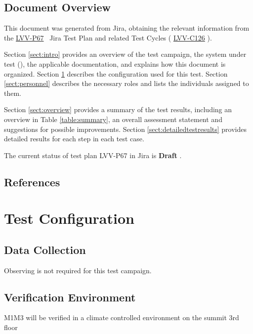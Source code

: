 \documentclass[SE,lsstdraft,STR,toc]{lsstdoc}
\begin{document}
\subsection{Document Overview}
\label{sect:docoverview}

This document was generated from Jira, obtaining the relevant information from the 
\href{https://jira.lsstcorp.org/secure/Tests.jspa#/testPlan/LVV-P67}{LVV-P67}
~Jira Test Plan and related Test Cycles (
  \href{https://jira.lsstcorp.org/secure/Tests.jspa#/testCycle/LVV-C126}{LVV-C126}
).

Section \ref{sect:intro} provides an overview of the test campaign, the system under test (\product{}), the applicable documentation, and explains how this document is organized.
Section \ref{sect:configuration}  describes the configuration used for this test.
Section \ref{sect:personnel} describes the necessary roles and lists the individuals assigned to them.

Section \ref{sect:overview} provides a summary of the test results, including an overview in Table \ref{table:summary}, an overall assessment statement and suggestions for possible improvements.
Section \ref{sect:detailedtestresults} provides detailed results for each step in each test case.

The current status of test plan LVV-P67 in Jira is \textbf{ Draft }.

\subsection{References}
\label{sect:references}
\renewcommand{\refname}{}

\section{Test Configuration}
\label{sect:configuration}

\subsection{Data Collection}

  Observing is not required for this test campaign.

\subsection{Verification Environment}
\label{sect:hwconf}
  M1M3 will be verified in a climate controlled environment on the summit
3rd floor
\end{document}
